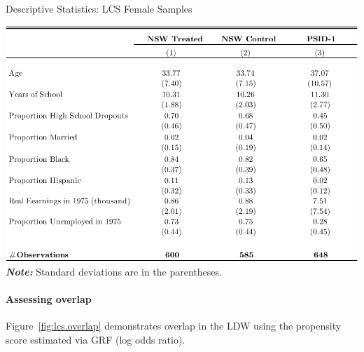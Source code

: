 \documentclass[letterpaper,12pt,leqno]{article}
\begin{document}
\begin{table}[!ht]
\caption{Descriptive Statistics: LCS Female Samples}\label{tb:samples_lcs}
\begin{minipage}[c]{0.9\textwidth}
\vspace{-0.5em}\includegraphics[width=\linewidth]{stats_lcs.pdf}
{\footnotesize\textbf{\textit{Note:}} Standard deviations are in the parentheses.}
\end{minipage}%
\end{table}
\clearpage

\paragraph{Assessing overlap} Figure~\ref{fig:lcs.overlap} demonstrates overlap in the LDW using the propensity score estimated via GRF (log odds ratio). 
\end{document}
